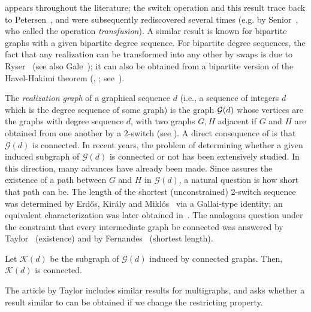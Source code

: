 \documentclass{BICA}
\begin{document}
 appears throughout the literature; the switch operation and this result trace back to Petersen~\cite{Petersen}, and were subsequently rediscovered several times (e.g. by Senior~\cite{Senior}, who called the operation \emph{transfusion}). A similar result is known for bipartite graphs with a given bipartite degree sequence. For bipartite degree sequences, the fact that any realization can be transformed into any other by swaps is due to Ryser~\cite{Ryser} (see also Gale~\cite{Gale}); it can also be obtained from a bipartite version of the Havel-Hakimi theorem (\cite{Hakimi}, \cite{Havel}; see~\cite{West}).

The \emph{realization graph} of a graphical sequence $d$ (i.e., a sequence of integers $d$ which is the degree sequence of some graph) is the graph ${\cal G}(d)$ whose vertices are the
graphs with degree sequence $d$, with two graphs $G,H$ adjacent if $G$ and $H$ are obtained from
one another by a $2$-switch (see \cite{arikati1999realization}). A direct consequence of  is that $\mathcal{G}(d)$ is connected. In recent years, the problem of determining whether a given induced subgraph of $\mathcal{G}(d)$ is connected or not has been extensively studied. In this direction, many advances have already been made. Since  assures the existence of a path between $G$ and $H$ in $\mathcal{G}(d)$, a natural question is how short that path can be. The length of the shortest (unconstrained) 2-switch sequence was determined by Erd\H{o}s, Kir\'aly and Mikl\'os~\cite{ErdosKiralyMiklos} via a Gallai-type identity; an equivalent characterization was later obtained in~\cite{BeregIto}. The analogous question under the constraint that every intermediate graph be connected was answered by Taylor~\cite{Taylor} (existence) and by Fernandes~\cite{Fernandes} (shortest length).

\begin{theorem}\label{Teo:Tay}
	Let $\mathcal{K}(d)$ be the subgraph of $\mathcal{G}(d)$ induced by connected graphs. Then, $\mathcal{K}(d)$ is connected.

\end{theorem}

The article by Taylor includes similar results for multigraphs, and asks whether a result similar to  can be obtained if we change the restricting property.
\end{document}
